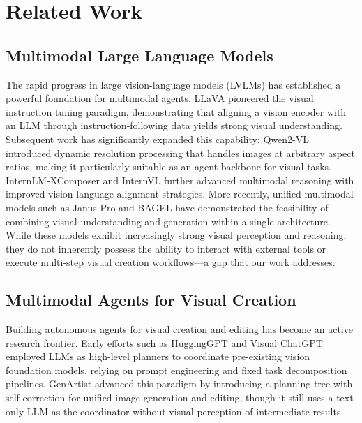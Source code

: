 \documentclass{article}
\begin{document}
\section{Related Work}

\subsection{Multimodal Large Language Models}

The rapid progress in large vision-language models (LVLMs) has established a powerful foundation for multimodal agents. LLaVA \cite{liu2023llava} pioneered the visual instruction tuning paradigm, demonstrating that aligning a vision encoder with an LLM through instruction-following data yields strong visual understanding. Subsequent work has significantly expanded this capability: Qwen2-VL \cite{yang2024qwen2vl} introduced dynamic resolution processing that handles images at arbitrary aspect ratios, making it particularly suitable as an agent backbone for visual tasks. InternLM-XComposer \cite{dong2024internlmxcomposer} and InternVL \cite{chen2024internvl} further advanced multimodal reasoning with improved vision-language alignment strategies. More recently, unified multimodal models such as Janus-Pro \cite{chen2025januspro} and BAGEL \cite{deng2025bagel} have demonstrated the feasibility of combining visual understanding and generation within a single architecture. While these models exhibit increasingly strong visual perception and reasoning, they do not inherently possess the ability to interact with external tools or execute multi-step visual creation workflows—a gap that our work addresses.

\subsection{Multimodal Agents for Visual Creation}

Building autonomous agents for visual creation and editing has become an active research frontier. Early efforts such as HuggingGPT \cite{shen2023hugginggpt} and Visual ChatGPT \cite{wu2023visualchatgpt} employed LLMs as high-level planners to coordinate pre-existing vision foundation models, relying on prompt engineering and fixed task decomposition pipelines. GenArtist \cite{zhu2024genartist} advanced this paradigm by introducing a planning tree with self-correction for unified image generation and editing, though it still uses a text-only LLM as the coordinator without visual perception of intermediate results.
\end{document}
